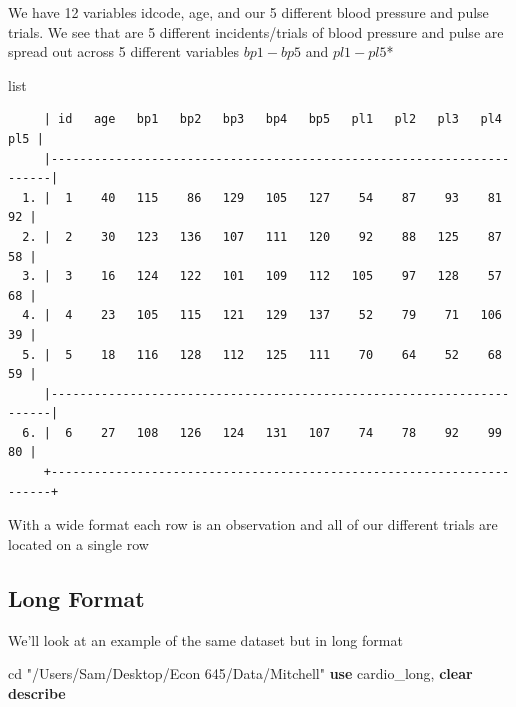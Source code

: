 \documentclass[
]{book}
\newenvironment{Shaded}{\begin{snugshade}}{\end{snugshade}}
\newcommand{\KeywordTok}[1]{\textcolor[rgb]{0.13,0.29,0.53}{\textbf{#1}}}
\newcommand{\NormalTok}[1]{#1}
\newcommand{\OtherTok}[1]{\textcolor[rgb]{0.56,0.35,0.01}{#1}}
\newcommand{\StringTok}[1]{\textcolor[rgb]{0.31,0.60,0.02}{#1}}
\begin{document}
We have 12 variables idcode, age, and our 5 different blood pressure and pulse trials. We see that are 5 different incidents/trials of blood pressure and pulse are spread out across 5 different variables \(bp1-bp5\) and \(pl1-pl5\)*

\begin{Shaded}
\begin{Highlighting}[]
\OtherTok{list}
\end{Highlighting}
\end{Shaded}

\begin{verbatim}
     | id   age   bp1   bp2   bp3   bp4   bp5   pl1   pl2   pl3   pl4   pl5 |
     |----------------------------------------------------------------------|
  1. |  1    40   115    86   129   105   127    54    87    93    81    92 |
  2. |  2    30   123   136   107   111   120    92    88   125    87    58 |
  3. |  3    16   124   122   101   109   112   105    97   128    57    68 |
  4. |  4    23   105   115   121   129   137    52    79    71   106    39 |
  5. |  5    18   116   128   112   125   111    70    64    52    68    59 |
     |----------------------------------------------------------------------|
  6. |  6    27   108   126   124   131   107    74    78    92    99    80 |
     +----------------------------------------------------------------------+
\end{verbatim}

With a wide format each row is an observation and all of our different trials are located on a single row

\subsection*{Long Format}\label{long-format}

We'll look at an example of the same dataset but in long format

\begin{Shaded}
\begin{Highlighting}[]
\NormalTok{cd }\StringTok{"/Users/Sam/Desktop/Econ 645/Data/Mitchell"}
\KeywordTok{use}\NormalTok{ cardio\_long, }\KeywordTok{clear}
\KeywordTok{describe}
\end{Highlighting}
\end{Shaded}
\end{document}
